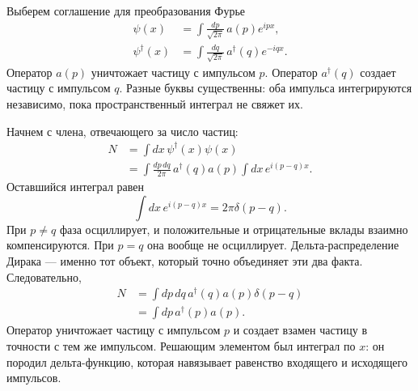 Выберем соглашение для преобразования Фурье
\begin{align}
\psi(x)&=\int\frac{dp}{\sqrt{2\pi}}\,a(p)e^{ipx},\\
\psi^\dagger(x)&=\int\frac{dq}{\sqrt{2\pi}}\,a^\dagger(q)e^{-iqx}.
\label{eq:l9-field-fourier}
\end{align}
Оператор \(a(p)\) уничтожает частицу с импульсом \(p\).
Оператор \(a^\dagger(q)\) создает частицу с импульсом \(q\). Разные буквы существенны: оба импульса интегрируются независимо, пока пространственный интеграл не свяжет их.

Начнем с члена, отвечающего за число частиц:
\begin{align}
N
&=\int dx\,\psi^\dagger(x)\psi(x)\\
&=\int\frac{dp\,dq}{2\pi}\,
a^\dagger(q)a(p)
\int dx\,e^{i(p-q)x}.
\end{align}
Оставшийся интеграл равен
\begin{equation}
\int dx\,e^{i(p-q)x}=2\pi\delta(p-q).
\end{equation}
При \(p\ne q\) фаза осциллирует, и положительные и отрицательные вклады взаимно компенсируются. При \(p=q\) она вообще не осциллирует. Дельта-распределение Дирака — именно тот объект, который точно объединяет эти два факта. Следовательно,
\begin{align}
N
&=\int dp\,dq\,a^\dagger(q)a(p)\delta(p-q)\\
&=\int dp\,a^\dagger(p)a(p).
\label{eq:l9-number-momentum}
\end{align}
Оператор уничтожает частицу с импульсом \(p\) и создает взамен частицу в точности с тем же импульсом. Решающим элементом был интеграл по \(x\): он породил дельта-функцию, которая навязывает равенство входящего и исходящего импульсов.

\begin{classroomqa}
\end{classroomqa}


